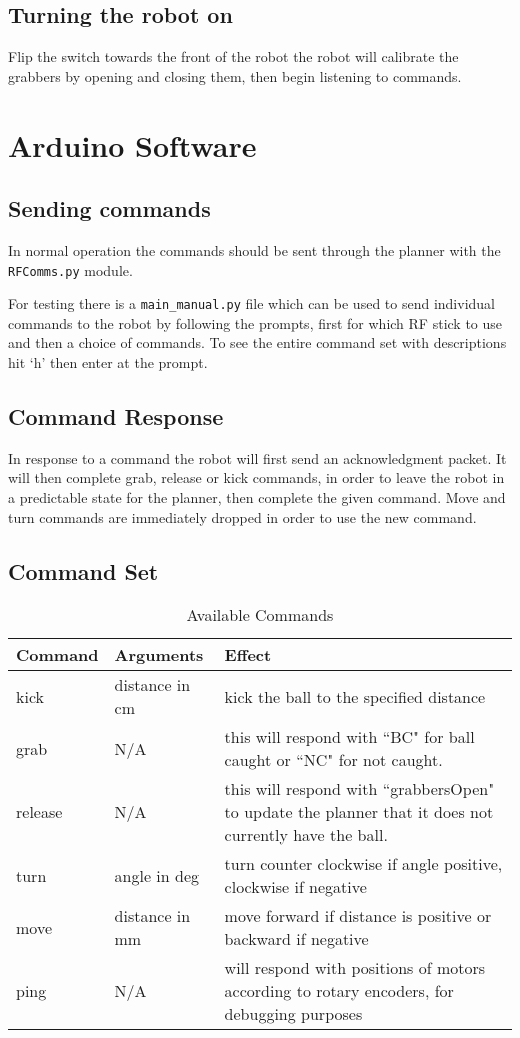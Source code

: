 \subsection{Turning the robot on}
Flip the switch towards the front of the robot the robot will calibrate the grabbers by opening and closing them, then begin listening to commands.

\section{Arduino Software}
\subsection{Sending commands}
In normal operation the commands should be sent through the planner with the \texttt{RFComms.py} module. 

For testing there is a \texttt{main\_manual.py} file which can be used to send individual commands to the robot by following the 
prompts, first for which RF stick to use and then a choice of commands. To see the entire command set  with descriptions hit `h' then enter at the prompt. 


\subsection{Command Response}
In response to a command the robot will first send an acknowledgment packet. It will then complete grab, release or kick commands, in order to leave the robot in a predictable state for the planner, then complete the given command. Move and turn commands are immediately dropped in order to use the new command. 

\subsection{Command Set}
\begin{table}[H]
\begin{tabularx}{\textwidth}{ llX }
\toprule
\textbf{Command} & \textbf{Arguments} & \textbf{Effect} \\
\midrule
kick & distance in cm & kick the ball to the specified distance\\
grab & N/A & this will respond with ``BC" for ball caught or ``NC" for not caught. \\
release & N/A & this will respond with ``grabbersOpen" to update the planner that it does not currently have the ball. \\
turn & angle in deg & turn counter clockwise if angle positive, clockwise if negative\\
move & distance in mm & move forward if distance is positive or backward if negative \\
ping & N/A &  will respond with positions of motors according to rotary encoders, for debugging purposes \\
\bottomrule
\end{tabularx}
\caption{Available Commands}
\end{table}

